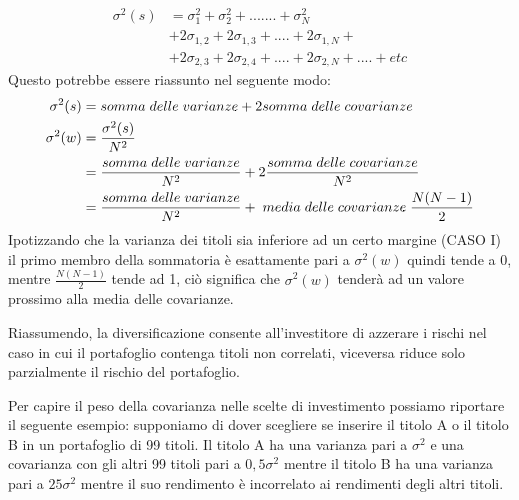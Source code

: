 \begin{equation}
\begin{split}
\sigma^{2}(s) & = \sigma^{2}_1+\sigma^{2}_2 +.......+ \sigma^{2}_N \\
&+2\sigma_{1,2} +2\sigma_{1,3} +....+ 2\sigma_{1,N} + \\
&+2\sigma_{2,3} +2\sigma_{2,4} +....+ 2\sigma_{2,N} +....+ etc
\end{split}
\end{equation}
Questo potrebbe essere riassunto nel seguente modo: 
\begin{equation}
\begin{split}
\sigma^{2}(s) & = somma\hspace{0,1cm} delle\hspace{0,1cm} varianze + 2 somma\hspace{0,1cm} delle\hspace{0,1cm} covarianze \\
\sigma^{2}(w) &= \frac{\sigma^{2}(s)}{N^2}\\
&= \frac{somma\hspace{0,1cm} delle\hspace{0,1cm} varianze}{N^2}  + 2\frac{somma\hspace{0,1cm} delle\hspace{0,1cm} covarianze }{N^2} \\
& = \frac{somma\hspace{0,1cm} delle\hspace{0,1cm}varianze}{N^2}
+ \hspace{0,1cm} media\hspace{0,1cm} delle\hspace{0,1cm} covarianze\hspace{0,1cm} {\dfrac{N(N-1)}{2}}
\end{split}
\end{equation}
Ipotizzando che la varianza dei titoli sia inferiore ad un certo margine (CASO I) il primo membro della sommatoria è esattamente pari a $\sigma^{2}(w)$ quindi tende a 0, mentre ${\frac{N(N-1)}{2}}$ tende ad 1, ciò significa che $\sigma^{2}(w)$ tenderà ad un valore prossimo alla media delle covarianze. 

Riassumendo, la diversificazione consente all'investitore di azzerare i rischi nel caso in cui il portafoglio contenga titoli non correlati, viceversa riduce solo parzialmente il rischio del portafoglio.

Per capire il peso della covarianza nelle scelte di investimento possiamo riportare il seguente esempio: supponiamo di dover scegliere se inserire il titolo A o il titolo B in un portafoglio di 99 titoli. Il titolo A ha una varianza pari a $\sigma^{2}$ e una covarianza con gli altri 99 titoli pari a $0,5\sigma^{2}$ mentre il titolo B ha una varianza pari a $25\sigma^{2}$ mentre il suo rendimento è incorrelato ai rendimenti degli altri titoli. 

